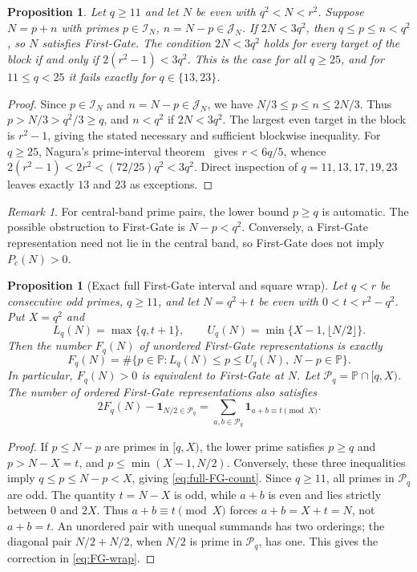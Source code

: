 \documentclass[final,11pt]{elsarticle}
\newtheorem{proposition}[theorem]{Proposition}
\theoremstyle{definition}
\theoremstyle{remark}
\newtheorem{remark}[theorem]{Remark}
\newcommand{\PP}{\mathbb{P}}
\newcommand{\band}{\mathcal{I}_N}
\newcommand{\cband}{\mathcal{J}_N}
\numberwithin{equation}{section}
\begin{document}
\begin{proposition}\label{prop:reduction}
Let $q\ge 11$ and let $N$ be even with $q^2<N<r^2$. Suppose $N=p+n$ with primes $p\in\band$, $n=N-p\in\cband$. If $2N<3q^2$, then $q\le p\le n<q^2$, so $N$ satisfies First-Gate. The condition $2N<3q^2$ holds for every target of the block if and only if $2(r^2-1)<3q^2$. This is the case for all $q\ge 25$, and for $11\le q<25$ it fails exactly for $q\in\{13,23\}$.
\end{proposition}

\begin{proof}
Since $p\in\band$ and $n=N-p\in\cband$, we have
$N/3\le p\le n\le2N/3$. Thus $p>N/3>q^2/3\ge q$,
and $n<q^2$ if $2N<3q^2$. The largest even target in the
block is $r^2-1$, giving the stated necessary and sufficient
blockwise inequality. For $q\ge25$, Nagura's prime-interval theorem~\cite{Nagura} gives
$r<6q/5$, whence
$2(r^2-1)<2r^2<(72/25)q^2<3q^2$.
Direct inspection of $q=11,13,17,19,23$ leaves exactly $13$ and
$23$ as exceptions.
\end{proof}

\begin{remark}
For central-band prime pairs, the lower bound $p\ge q$ is automatic. The possible obstruction to First-Gate is $N-p<q^2$. Conversely, a First-Gate representation need not lie in the central band, so First-Gate does not imply $P_c(N)>0$.
\end{remark}

\begin{proposition}[Exact full First-Gate interval and square wrap]
\label{prop:full-FG-window}
Let $q<r$ be consecutive odd primes, $q\ge 11$, and let $N=q^2+t$ be even with $0<t<r^2-q^2$. Put $X=q^2$ and
\[
L_q(N)=\max\{q,t+1\},\qquad U_q(N)=\min\{X-1,\lfloor N/2\rfloor\}.
\]
Then the number $F_q(N)$ of unordered First-Gate representations is exactly
\begin{equation}\label{eq:full-FG-count}
F_q(N)=\#\{p\in\PP:L_q(N)\le p\le U_q(N),\ N-p\in\PP\}.
\end{equation}
In particular, $F_q(N)>0$ is equivalent to First-Gate at $N$. Let
$\mathcal P_q=\PP\cap[q,X)$. The number of \emph{ordered} First-Gate representations also satisfies
\begin{equation}\label{eq:FG-wrap}
2F_q(N)-\mathbf 1_{N/2\in\mathcal P_q}=\sum_{a,b\in\mathcal P_q}\mathbf 1_{a+b\equiv t\pmod X}.
\end{equation}
\end{proposition}
\begin{proof}
If $p\le N-p$ are primes in $[q,X)$, the lower prime satisfies
$p\ge q$ and $p>N-X=t$, and $p\le\min(X-1,N/2)$. Conversely,
these three inequalities imply $q\le p\le N-p<X$, giving
\eqref{eq:full-FG-count}. Since $q\ge11$, all primes in
$\mathcal P_q$ are odd. The quantity $t=N-X$ is odd, while
$a+b$ is even and lies strictly between $0$ and $2X$.
Thus $a+b\equiv t\pmod X$ forces $a+b=X+t=N$, not $a+b=t$.
An unordered pair with unequal summands has two orderings;
the diagonal pair $N/2+N/2$, when $N/2$ is prime in $\mathcal P_q$,
has one. This gives the correction in \eqref{eq:FG-wrap}.
\end{proof}
\end{document}
